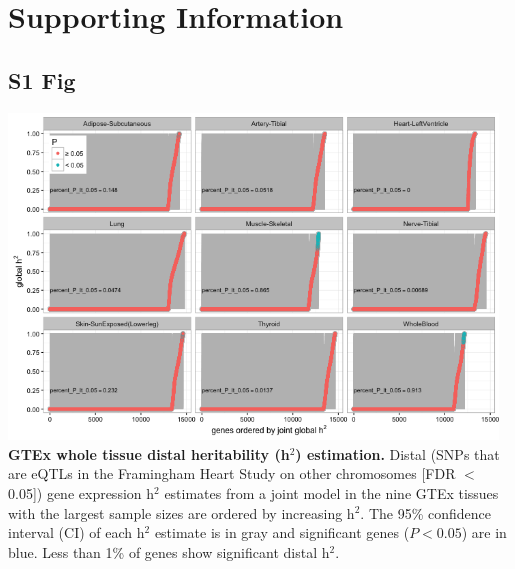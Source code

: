 \documentclass[10pt,letterpaper]{article}
\begin{document}
\nolinenumbers


%
%
% 



\section*{Supporting Information}

\begin{singlespace}



\subsection*{S1 Fig}
\includegraphics[width=13cm]{Figures/GenArch_Supp/S1Fig.png}
\label{S1_Fig}
{\bf GTEx whole tissue distal heritability (h$^2$) estimation.} Distal (SNPs that are eQTLs in the Framingham Heart Study on other chromosomes [FDR $<$ 0.05]) gene expression h$^2$ estimates from a joint model in the nine GTEx tissues with the largest sample sizes are ordered by increasing h$^2$. The 95\% confidence interval (CI) of each h$^2$ estimate is in gray and significant genes ($P<0.05$) are in blue. Less than 1\% of genes show significant distal h$^2$.


\end{singlespace}
\end{document}
